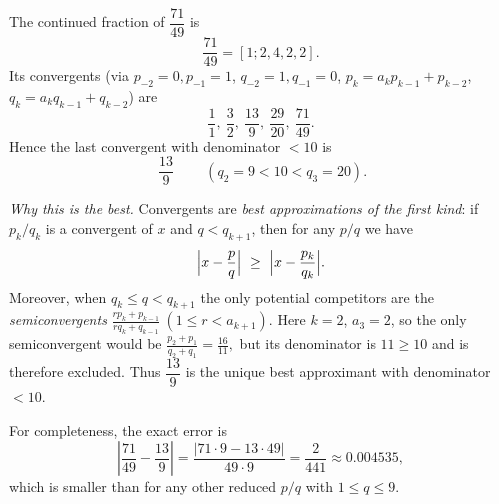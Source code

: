 \begin{solution}
The continued fraction of $\dfrac{71}{49}$ is
	\[
	\frac{71}{49}=[1;2,4,2,2].
	\]
	Its convergents (via $p_{-2}=0,p_{-1}=1$, $q_{-2}=1,q_{-1}=0$, $p_k=a_kp_{k-1}+p_{k-2}$,
	$q_k=a_kq_{k-1}+q_{k-2}$) are
	\[
	\frac{1}{1},\ \frac{3}{2},\ \frac{13}{9},\ \frac{29}{20},\ \frac{71}{49}.
	\]
	Hence the last convergent with denominator $<10$ is
	\[
	\boxed{\ \frac{13}{9}\ } \qquad(q_2=9<10<q_3=20).
	\]

	\emph{Why this is the best.}  Convergents are \emph{best approximations of the first kind}:
	if $p_k/q_k$ is a convergent of $x$ and $q<q_{k+1}$, then for any $p/q$ we have
	\[
	\Bigl|x-\frac{p}{q}\Bigr|\ \ge\ \Bigl|x-\frac{p_k}{q_k}\Bigr|.
	\]
	Moreover, when $q_k\le q<q_{k+1}$ the only potential competitors are the
	\emph{semiconvergents}
	\(
	\frac{r p_k+p_{k-1}}{r q_k+q_{k-1}}\ (1\le r<a_{k+1}).
	\)
	Here $k=2$, $a_{3}=2$, so the only semiconvergent would be
	\(
	\frac{p_2+p_1}{q_2+q_1}=\frac{16}{11},
	\)
	but its denominator is $11\ge10$ and is therefore excluded.
	Thus $\dfrac{13}{9}$ is the unique best approximant with denominator $<10$.

	For completeness, the exact error is
	\[
	\left|\frac{71}{49}-\frac{13}{9}\right|
	=\frac{|71\cdot 9-13\cdot 49|}{49\cdot 9}
	=\frac{2}{441}\approx 0.004535,
	\]
	which is smaller than for any other reduced $p/q$ with $1\le q\le 9$.
\end{solution}

